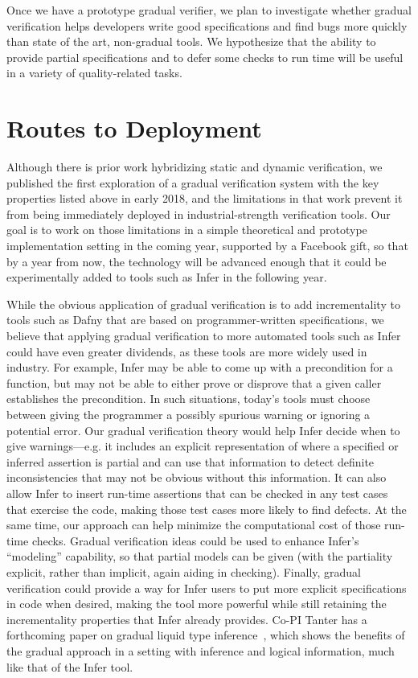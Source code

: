 \documentclass[10pt,twocolumn]{article}
\begin{document}
\begin{sloppypar}
Once we have a prototype gradual verifier, we plan to investigate whether gradual verification helps developers write good specifications and find bugs more quickly than state of the art, non-gradual tools.
We hypothesize that the ability to provide partial specifications and to defer some checks to run time will be useful in a variety of quality-related tasks.

\section{Routes to Deployment}
\vspace{-2ex}

Although there is prior work hybridizing static and dynamic verification, we published the first exploration of a gradual verification system with the key properties listed above in early 2018, and the limitations in that work prevent it from being immediately deployed in industrial-strength verification tools.  Our goal is to work on those limitations in a simple theoretical and prototype implementation setting in the coming year, supported by a Facebook gift, so that by a year from now, the technology will be advanced enough that it could be experimentally added to tools such as Infer in the following year.

While the obvious application of gradual verification is to add incrementality to tools such as Dafny that are based on programmer-written specifications, we believe that applying gradual verification to more automated tools such as Infer could have even greater dividends, as these tools are more widely used in industry. For example, Infer may be able to come up with a precondition for a function, but may not be able to either prove or disprove that a given caller establishes the precondition.  In such situations, today's tools must choose between giving the programmer a possibly spurious warning or ignoring a potential error. Our gradual verification theory would help Infer decide when to give warnings---e.g. it includes an explicit representation of where a specified or inferred assertion is partial and can use that information to detect definite inconsistencies that may not be obvious without this information.  It can also allow Infer to insert run-time assertions that can be checked in any test cases that exercise the code, making those test cases more likely to find defects.  At the same time, our approach can help minimize the computational cost of those run-time checks.  Gradual verification ideas could be used to enhance Infer's ``modeling'' capability, so that partial models can be given (with the partiality explicit, rather than implicit, again aiding in checking). Finally, gradual verification could provide a way for Infer users to put more explicit specifications in code when desired, making the tool more powerful while still retaining the incrementality properties that Infer already provides.
Co-PI Tanter has a forthcoming paper on gradual liquid type inference~\cite{vazouAl:oopsla2018}, which shows the benefits of the gradual approach in a setting with inference and logical information, much like that of the Infer tool.


\end{sloppypar}
\end{document}
